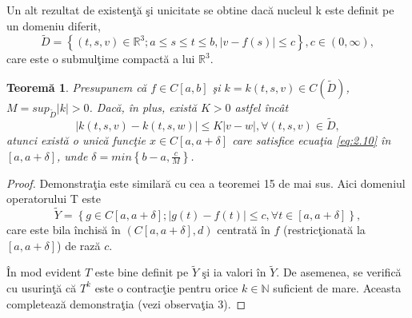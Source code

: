 \documentclass[a4paper,12pt,oneside]{report}
\newtheorem{theorem}{Teorem\u a}
\begin{document}
\noindent Un alt rezultat de existen\c{t}\u{a} \c{s}i unicitate se obtine dac\u{a} nucleul k este definit pe un domeniu diferit,
\begin{displaymath}
\tilde{D} = \left \{ \left ( t,s,v \right ) \in \mathbb{R}^{3}; a\leq s\leq t\leq b, \left | v - f\left ( s \right ) \right | \leq c \right \}, c\in \left ( 0, \infty  \right ),
\end{displaymath}
care este o submul\c{t}ime compact\u{a} a lui \(\mathbb{R}^{3}\).
\begin{theorem}
Presupunem c\u{a} \(f \in C \left [ a,b \right ]\) \c{s}i \(k = k\left ( t,s,v \right ) \in C\left ( \tilde{D} \right )\),  \(M = sup _{\tilde{D}}\left | k \right |> 0\). Dac\u{a}, \^{i}n plus, exist\u{a}  \(K > 0\) astfel \^{i}nc\^{a}t
\begin{displaymath}
\left | k\left ( t,s,v \right ) - k \left ( t,s,w \right ) \right | \leq K \left | v-w \right |, \forall \left ( t,s,v \right ) \in \tilde{D}, \label{eq:2.14} \tag{2.14}
\end{displaymath}
atunci exist\u{a} o unic\u{a} func\c{t}ie \(x \in C \left [ a, a + \delta  \right ]\) care satisfice ecua\c{t}ia \ref{eq:2.10} \^{i}n  \(\left [ a, a + \delta  \right ]\), unde \(\delta = min \left \{ b-a, \frac{c}{M} \right \}\).
\end{theorem}


\begin{proof}

Demonstra\c{t}ia este similar\u{a} cu cea a teoremei 15  de mai sus. Aici domeniul operatorului T este
\begin{displaymath}
\tilde{Y} = \left \{ g \in C \left [ a, a+ \delta  \right ] ; \left | g\left ( t \right ) - f\left ( t \right ) \right | \leq c, \forall t \in \left [ a, a+ \delta  \right ] \right \},
\end{displaymath}
care este bila \^{i}nchis\u{a} \^{i}n \(\left ( C\left [ a, a+ \delta  \right ], d \right )\) centrat\u{a} \^{i}n \(f\) (restric\c{t}ionat\u{a} la \(\left [ a, a+ \delta  \right ]\)) de raz\u{a} \(c\).

\^{I}n mod evident  \(T\) este bine definit pe \(\tilde{Y}\) \c{s}i ia valori \^{i}n \(\tilde{Y}\). De asemenea, se verific\u{a} cu usurin\c{t}\u{a} c\u{a} \(T^{k}\) este o contrac\c{t}ie pentru orice \(k \in \mathbb{N}\)  suficient de mare. Aceasta completeaz\u{a} demonstra\c{t}ia (vezi observa\c{t}ia 3).
					\end{proof}
\end{document}
